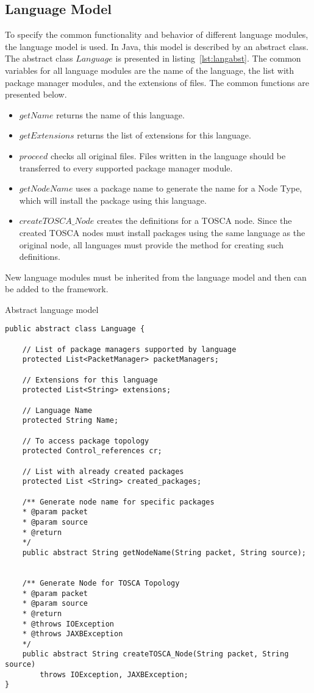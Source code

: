 \subsection*{Language Model}
To specify the common functionality and behavior of different language modules, the language model is used. 
In Java, this model is described by an abstract class. 
The abstract class $Language$ is presented in listing~\ref{lst:langabst}.
The common variables for all language modules are the name of the language, the list with package manager modules, and the extensions of files.
The common functions are presented below.
\begin{itemize}
	\item $getName$ returns the name of this language.
	\item $getExtensions$ returns the list of extensions for this language.
	\item $proceed$ checks all original files.  
	Files written in the language should be transferred to every supported package manager module.
	\item $getNodeName$ uses a package name to generate the name for a Node Type, which will install the package using this language.
	\item $createTOSCA\_Node$ creates the definitions for a TOSCA node. 
	Since the created TOSCA nodes must install packages using the same language as the original node, all languages must provide the method for creating such definitions.
\end{itemize}
New language modules must be inherited from the language model and then can be added to the framework.
\begin{Listing}
	\caption{Abstract language model}
	\label{lst:langabst}
\begin{lstlisting}
public abstract class Language {
	
	// List of package managers supported by language
	protected List<PacketManager> packetManagers;
	
	// Extensions for this language
	protected List<String> extensions;
	
	// Language Name
	protected String Name;
	
	// To access package topology
	protected Control_references cr;
	
	// List with already created packages
	protected List <String> created_packages;
	
	/**	Generate node name for specific packages
	* @param packet
	* @param source
	* @return
	*/
	public abstract String getNodeName(String packet, String source);
	
	
	/**	Generate Node for TOSCA Topology
	* @param packet
	* @param source
	* @return
	* @throws IOException
	* @throws JAXBException
	*/
	public abstract String createTOSCA_Node(String packet, String source)
		throws IOException, JAXBException;
}
\end{lstlisting}
\end{Listing}
